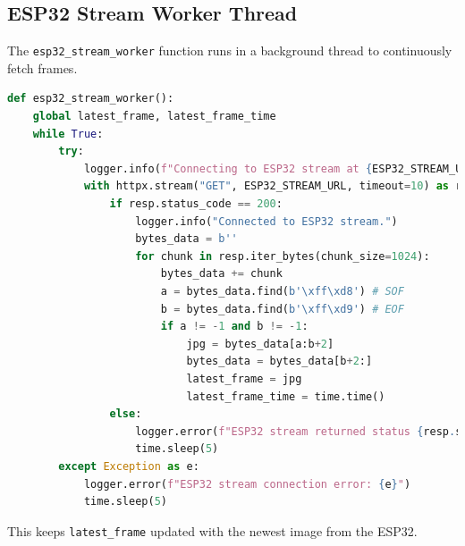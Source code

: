 \documentclass[12pt, a4paper]{report}
\begin{document}
\subsection{ESP32 Stream Worker Thread}
The \texttt{esp32\_stream\_worker} function runs in a background thread to continuously fetch frames.
\begin{lstlisting}[language=Python, caption={FastAPI ESP32 Stream Worker Snippet}, label={lst:fastapi_worker_ch4}] % Changed label
def esp32_stream_worker():
    global latest_frame, latest_frame_time
    while True:
        try:
            logger.info(f"Connecting to ESP32 stream at {ESP32_STREAM_URL}")
            with httpx.stream("GET", ESP32_STREAM_URL, timeout=10) as resp:
                if resp.status_code == 200:
                    logger.info("Connected to ESP32 stream.")
                    bytes_data = b''
                    for chunk in resp.iter_bytes(chunk_size=1024):
                        bytes_data += chunk
                        a = bytes_data.find(b'\xff\xd8') # SOF
                        b = bytes_data.find(b'\xff\xd9') # EOF
                        if a != -1 and b != -1:
                            jpg = bytes_data[a:b+2]
                            bytes_data = bytes_data[b+2:]
                            latest_frame = jpg
                            latest_frame_time = time.time()
                else:
                    logger.error(f"ESP32 stream returned status {resp.status_code}")
                    time.sleep(5)
        except Exception as e:
            logger.error(f"ESP32 stream connection error: {e}")
            time.sleep(5)
\end{lstlisting}
This keeps \texttt{latest\_frame} updated with the newest image from the ESP32.
\end{document}
